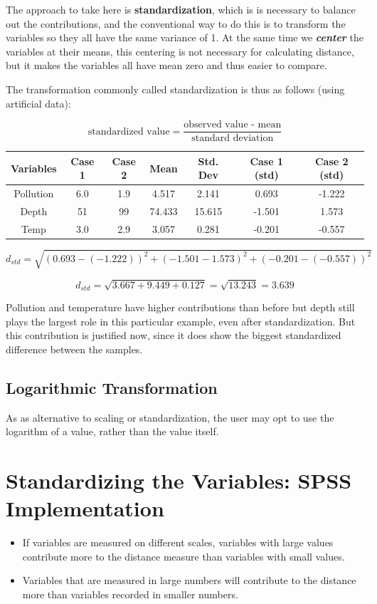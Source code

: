 \documentclass[a4paper,12pt]{report}
\begin{document}
\begin{itemize}
\noindent The approach to take here is \textbf{standardization}, which is is necessary to balance out the contributions, and the
conventional way to do this is to transform the variables so they all have the same variance
of 1. At the same time we \textbf{\textit{center}} the variables at their means, this centering is not
necessary for calculating distance, but it makes the variables all have mean zero and thus
easier to compare. 

\noindent The transformation commonly called standardization is thus as follows (using artificial data):
{
	\large
\[\mbox{standardized value} = \frac{\mbox{observed value - mean}}{ \mbox{standard deviation}}\]
\begin{center}
	\begin{tabular}{|c|c|c|c|c|c|c|}
		\hline
		Variables & Case 1 & Case 2 & Mean & Std. Dev & Case 1 (std) & Case 2 (std) \\ \hline
		Pollution & 6.0 & 1.9 & 4.517	&	2.141	&	0.693	&	-1.222	\\
		Depth & 51 & 99 & 74.433	&	15.615	&	-1.501	&	1.573	\\
		Temp & 3.0 & 2.9 & 3.057	&	0.281	&	-0.201	&	-0.557	\\
		\hline
	\end{tabular}
\end{center}
}
\[ d_{std} =  \sqrt{(0.693 - (- 1.222))^2 + (-1.501-1.573)^2 + (-0.201-(-0.557))^2} \]

\[ d_{std} = \sqrt{3.667 + 9.449 + 0.127} = \sqrt{13.243} = 3.639 \]

Pollution and temperature have higher contributions than before but depth still plays the
largest role in this particular example, even after standardization. But this contribution is
justified now, since it does show the biggest standardized difference between the samples. 
\subsection{Logarithmic Transformation}
As as alternative to scaling or standardization, the user may opt to use the logarithm of a value, rather than the value itself.
\newpage
\section{Standardizing the Variables: SPSS Implementation}
\begin{itemize}
	\item If variables are measured on different scales, variables with large values contribute
	more to the distance measure than variables with small values.
	\item Variables that are measured in large numbers will contribute to the distance more than variables recorded in smaller
	numbers.
	

\end{itemize}
\end{itemize}
\end{document}
